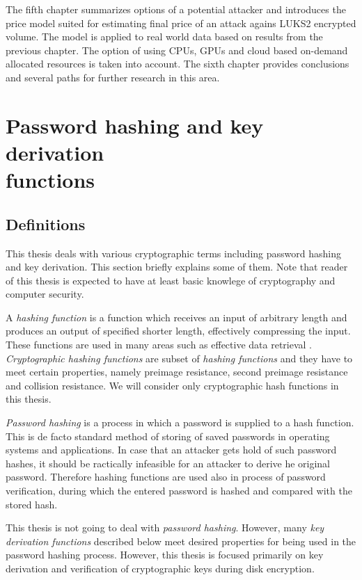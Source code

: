 \documentclass[nolof]{fithesis3}
\begin{document}
The fifth chapter summarizes options of a potential attacker and introduces the price model suited for estimating final price of an attack agains LUKS2 encrypted volume. The model is applied to real world data based on results from the previous chapter. The option of using CPUs, GPUs and cloud based on-demand allocated resources is taken into account. The sixth chapter provides conclusions and several paths for further research in this area.

\chapter{Password hashing and key derivation\\functions}

\section{Definitions}
\label{definitions}
This thesis deals with various cryptographic terms including password hashing and key derivation. This section briefly explains some of them. Note that reader of this thesis is expected to have at least basic knowlege of cryptography and computer security.

A \emph{hashing function} is a function which receives an input of arbitrary length and produces an output of specified shorter length, effectively compressing the input. These functions are used in many areas such as effective data retrieval \parencite{itmc14}. \emph{Cryptographic hashing functions} are subset of \emph{hashing functions} and they have to meet certain properties, namely preimage resistance, second preimage resistance and collision resistance. We will consider only cryptographic hash functions in this thesis.

\emph{Password hashing} is a process in which a password is supplied to a hash function. This is de facto standard method of storing of saved passwords in operating systems and applications. In case that an attacker gets hold of such password hashes, it should be ractically infeasible for an attacker to derive he original password. Therefore hashing functions are used also in process of password verification, during which the entered password is hashed and compared with the stored hash.

This thesis is not going to deal with \emph{password hashing}. However, many \emph{key derivation functions} described below meet desired properties for being used in the password hashing process. However, this thesis is focused primarily on key derivation and verification of cryptographic keys during disk encryption.
\end{document}
